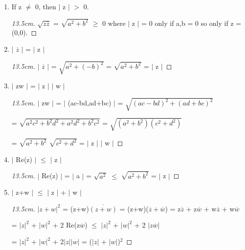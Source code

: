 	\begin{enumerate}[label=(\alph*), leftmargin=2cm, itemsep=0.1cm]
		\item If z $\neq$ 0, then $|$ z $|$ $>$ 0.

			\begin{proof}[13.5cm]
				$\sqrt{z\overline{z}}$ = $\sqrt{a^2 + b^2}$ $\geq$ 0
				where $|$ z $|$ = 0 only if a,b = 0 so only if z = (0,0).
			\end{proof}

		\item $|$ $\overline{z}$ $|$ = $|$ z  $|$
			
			\begin{proof}[13.5cm]
				$|$ $\overline{z}$ $|$ = $\sqrt{a^2 + (-b)^2}$
				= $\sqrt{a^2 + b^2}$ = $|$ z $|$
			\end{proof}

		\item $|$ zw $|$ = $|$ z $|$ $|$ w $|$
		
			\begin{proof}[13.5cm]
				$|$ zw $|$ = $|$ (ac-bd,ad+bc) $|$ = $\sqrt{(ac-bd)^2 + (ad+bc)^2}$
			
				= $\sqrt{a^2c^2 + b^2d^2 + a^2d^2 + b^2c^2}$
				= $\sqrt{(a^2+b^2)(c^2+d^2)}$

				= $\sqrt{a^2+b^2}$ $\sqrt{c^2+d^2}$ = $|$ z $|$ $|$ w $|$
			\end{proof}

		\item $|$ Re(z) $|$ $\leq$ $|$ z $|$

			\begin{proof}[13.5cm]
				$|$ Re(z) $|$ = $|$ a $|$ = $\sqrt{a^2}$
				$\leq$ $\sqrt{a^2+b^2}$ = $|$ z $|$
			\end{proof}

		\item $|$ z+w $|$ $ \leq $  $|$ z $|$ + $|$ w $|$
		
			\begin{proof}[13.5cm]
				$| z+w |^2$ = (z+w)$\overline{(z+w)}$
				= (z+w)($\overline{z} + \overline{w}$)
				= z$\overline{z}$ + z$\overline{w}$
				+ w$\overline{z}$ + w$\overline{w}$
			
				= $|z|^2$ + $|w|^2$ + 2 Re(z$\overline{w}$)
				$\leq$ $|z|^2$ + $|w|^2$ + 2 $|z\overline{w}|$

				= $|z|^2$ + $|w|^2$ + 2$|z||w|$
				= ($|z|$ + $|w|$)$^2$				
			\end{proof}
	\end{enumerate}

